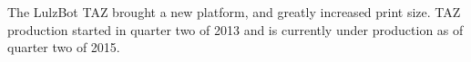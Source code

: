 %
%
%
%
%

The LulzBot TAZ brought a new platform, and greatly increased print size.
TAZ production started in quarter two of 2013 and is currently under
production as of quarter two of 2015.







